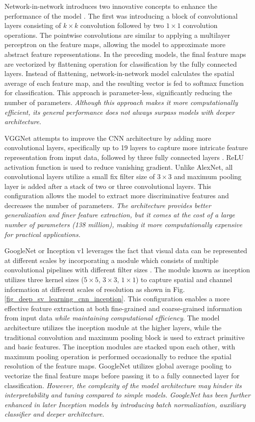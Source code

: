 \documentclass[preprint,12pt]{elsarticle}
\begin{document}
Network-in-network introduces two innovative concepts to enhance the performance of the model \citep{lin_network_2014}. The first was introducing a block of convolutional layers consisting of $k \times k$ convolution followed by two $1 \times 1$ convolution operations. The pointwise convolutions are similar to applying a multilayer perceptron on the feature maps, allowing the model to approximate more abstract feature representations. In the preceding models, the final feature maps are vectorized by flattening operation for classification by the fully connected layers. Instead of flattening, network-in-network model calculates the spatial average of each feature map, and the resulting vector is fed to softmax function for classification. This approach is parameter-less, significantly reducing the number of parameters. \emph{Although this approach makes it more computationally efficient, its general performance does not always surpass models with deeper architecture.}

VGGNet attempts to improve the CNN architecture by adding more convolutional layers, specifically up to 19 layers to capture more intricate feature representation from input data, followed by three fully connected layers \citep{simonyan_very_2015}. ReLU activation function is used to reduce vanishing gradient. Unlike AlexNet, all convolutional layers utilize a small fix filter size of $3 \times 3$ and maximum pooling layer is added after a stack of two or three convolutional layers. This configuration allows the model to extract more discriminative features and decreases the number of parameters. \emph{The architecture provides better generalization and finer feature extraction, but it comes at the cost of a large number of parameters (138 million), making it more computationally expensive for practical applications.}

GoogleNet or Inception v1 leverages the fact that visual data can be represented at different scales by incorporating a module which consists of multiple convolutional pipelines with different filter sizes \citep{szegedy_going_2014}. The module known as inception utilizes three kernel sizes ($5 \times 5$, $3 \times 3$, $1 \times 1$) to capture spatial and channel information at different scales of resolution as shown in Fig. \ref{fig_deep_sv_learning_cnn_inception}. This configuration enables a more effective feature extraction at both fine-grained and coarse-grained information from input data \emph{while maintaining computational efficiency}. The model architecture utilizes the inception module at the higher layers, while the traditional convolution and maximum pooling block is used to extract primitive and basic features. The inception modules are stacked upon each other, with maximum pooling operation is performed occasionally to reduce the spatial resolution of the feature maps. GoogleNet utilizes global average pooling to vectorize the final feature maps before passing it to a fully connected layer for classification. \emph{However, the complexity of the model architecture may hinder its interpretability and tuning compared to simple models. GoogleNet has been further enhanced in later Inception models by introducing batch normalization, auxiliary classifier and deeper architecture.}
\end{document}

